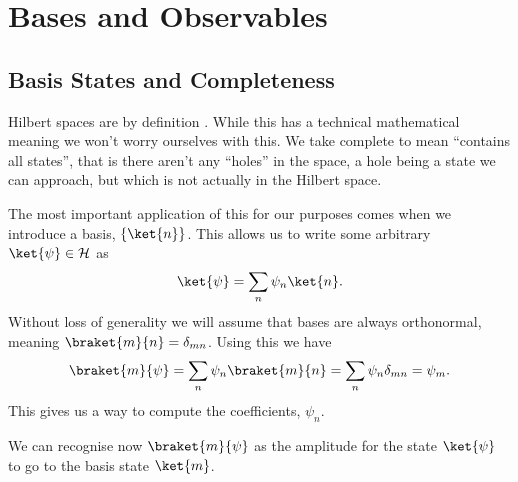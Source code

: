 \documentclass[fleqn]{NotesClass}
\newcommand*{\hilbert}{\mathcal{H}}
\begin{document}
    \chapter{Bases and Observables}
    \section{Basis States and Completeness}
    Hilbert spaces are by definition .
    While this has a technical mathematical meaning we won't worry ourselves with this.
    We take complete to mean \enquote{contains all states}, that is there aren't any \enquote{holes} in the space, a hole being a state we can approach, but which is not actually in the Hilbert space.
    
    The most important application of this for our purposes comes when we introduce a basis, \(\{\ket{n}\}\).
    This allows us to write some arbitrary \(\ket{\psi}\in\hilbert\) as
    \begin{equation}
        \ket{\psi} = \sum_n \psi_n\ket{n}.
    \end{equation}
    Without loss of generality we will assume that bases are always orthonormal, meaning \(\braket{m}{n} = \delta_{mn}\).
    Using this we have
    \begin{equation}
        \braket{m}{\psi} = \sum_n \psi_n\braket{m}{n} = \sum_n \psi_n\delta_{mn} = \psi_m.
    \end{equation}
    This gives us a way to compute the coefficients, \(\psi_n\).
    
    We can recognise now \(\braket{m}{\psi}\) as the amplitude for the state \(\ket{\psi}\) to go to the basis state \(\ket{m}\).
    
\end{document}
